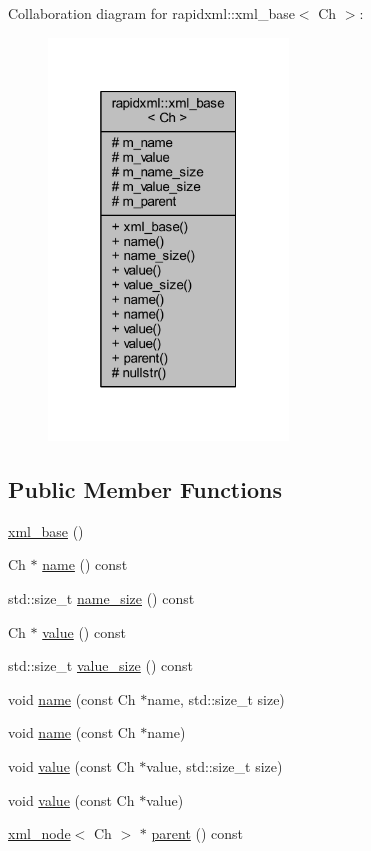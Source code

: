 Collaboration diagram for rapidxml\+:\+:xml\+\_\+base$<$ Ch $>$\+:
\nopagebreak
\begin{figure}[H]
\begin{center}
\leavevmode
\includegraphics[width=181pt]{classrapidxml_1_1xml__base__coll__graph}
\end{center}
\end{figure}
\subsection*{Public Member Functions}
\begin{DoxyCompactItemize}
\item 
\hyperlink{classrapidxml_1_1xml__base_a23e7f7aac02d17a0a01afb597e4b966b}{xml\+\_\+base} ()
\item 
Ch $\ast$ \hyperlink{classrapidxml_1_1xml__base_a9a09739310469995db078ebd0da3ed45}{name} () const 
\item 
std\+::size\+\_\+t \hyperlink{classrapidxml_1_1xml__base_a7e7f98b3d01e1eab8dc1ca69aad9af84}{name\+\_\+size} () const 
\item 
Ch $\ast$ \hyperlink{classrapidxml_1_1xml__base_adcdaccff61c665f039d9344e447b7445}{value} () const 
\item 
std\+::size\+\_\+t \hyperlink{classrapidxml_1_1xml__base_a9fcf201ed0915ac18dd43b0b5dcfaf32}{value\+\_\+size} () const 
\item 
void \hyperlink{classrapidxml_1_1xml__base_ae55060ae958c6e6465d6c8db852ec6ce}{name} (const Ch $\ast$name, std\+::size\+\_\+t size)
\item 
void \hyperlink{classrapidxml_1_1xml__base_a4611ddc82ac83a527c65606600eb2a0d}{name} (const Ch $\ast$name)
\item 
void \hyperlink{classrapidxml_1_1xml__base_a3b183c2db7022a6d30494dd2f0ac11e9}{value} (const Ch $\ast$value, std\+::size\+\_\+t size)
\item 
void \hyperlink{classrapidxml_1_1xml__base_a81e63ec4bfd2d7ef0a6c2ed49be6e623}{value} (const Ch $\ast$value)
\item 
\hyperlink{singletonrapidxml_1_1xml__node}{xml\+\_\+node}$<$ Ch $>$ $\ast$ \hyperlink{classrapidxml_1_1xml__base_a7f31ae930f93852830234db1ae59c4c4}{parent} () const 
\end{DoxyCompactItemize}

